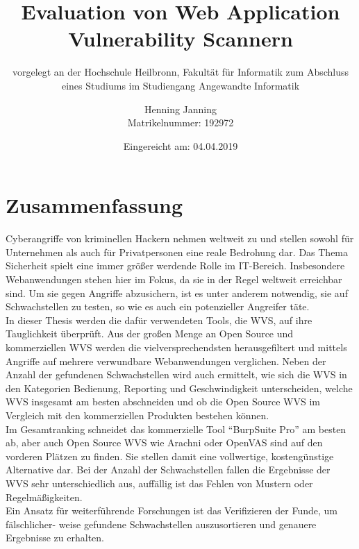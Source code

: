 \documentclass[12pt,oneside,a4paper,parskip,pointlessnumbers]{scrbook}
\def\BaAuthor{Henning Janning}
\def\BaTitle{Evaluation von Web Application Vulnerability Scannern}
\def\BaSupervisorOne{Prof. Dr.-Ing. Andreas Mayer}
\def\BaSupervisorTwo{Susanne Steuer, M.Sc.}
\def\BaDeadline{04.04.2019}
\def\MatNr{192972}
\begin{document}


\frontmatter
\titlehead{%
  {Hochschule Heilbronn\\
   Fakultät für Informatik}}
\subject{Bachelorarbeit}
\title{\BaTitle\\[15mm]}
\subtitle{\normalsize{vorgelegt an der Hochschule Heilbronn, Fakultät für Informatik zum Abschluss eines Studiums im Studiengang Angewandte Informatik}}
\author{\BaAuthor\\
\normalsize{Matrikelnummer: \MatNr}}
\bigskip
\date{\normalsize{Eingereicht am: \BaDeadline}}
\publishers{
  \normalsize{Erstpr\"{u}fer: \BaSupervisorOne}\\
  \normalsize{Zweitpr\"{u}ferin: \BaSupervisorTwo}\\
}


\maketitle



\section*{Zusammenfassung}
Cyberangriffe von kriminellen Hackern nehmen weltweit zu und stellen sowohl für Unternehmen als auch für Privatpersonen eine reale Bedrohung dar. Das Thema Sicherheit spielt eine immer größer werdende Rolle im IT-Bereich. Insbesondere Webanwendungen stehen hier im Fokus, da sie in der Regel weltweit erreichbar sind. Um sie gegen Angriffe abzusichern, ist es unter anderem notwendig, sie auf Schwachstellen zu testen, so wie es auch ein potenzieller Angreifer täte.\\
In dieser Thesis werden die dafür verwendeten Tools, die \ac{WVS}, auf ihre Tauglichkeit überprüft. Aus der großen Menge an Open Source und kommerziellen WVS werden die vielversprechendsten herausgefiltert und mittels Angriffe auf mehrere verwundbare Webanwendungen verglichen. Neben der Anzahl der gefundenen Schwachstellen wird auch ermittelt, wie sich die WVS in den Kategorien Bedienung, Reporting und Geschwindigkeit unterscheiden, welche WVS insgesamt am besten abschneiden und ob die Open Source WVS im Vergleich mit den kommerziellen Produkten bestehen können.\\
Im Gesamtranking schneidet das kommerzielle Tool ``BurpSuite Pro'' am besten ab, aber auch Open Source WVS wie Arachni oder OpenVAS sind auf den vorderen Plätzen zu finden. Sie stellen damit eine vollwertige, kostengünstige Alternative dar. Bei der Anzahl der Schwachstellen fallen die Ergebnisse der WVS sehr unterschiedlich aus, auffällig ist das Fehlen von Mustern oder Regelmäßigkeiten.\\
Ein Ansatz für weiterführende Forschungen ist das Verifizieren der Funde, um fälschlicher- weise gefundene Schwachstellen auszusortieren und genauere Ergebnisse zu erhalten.
\newpage
\end{document}
